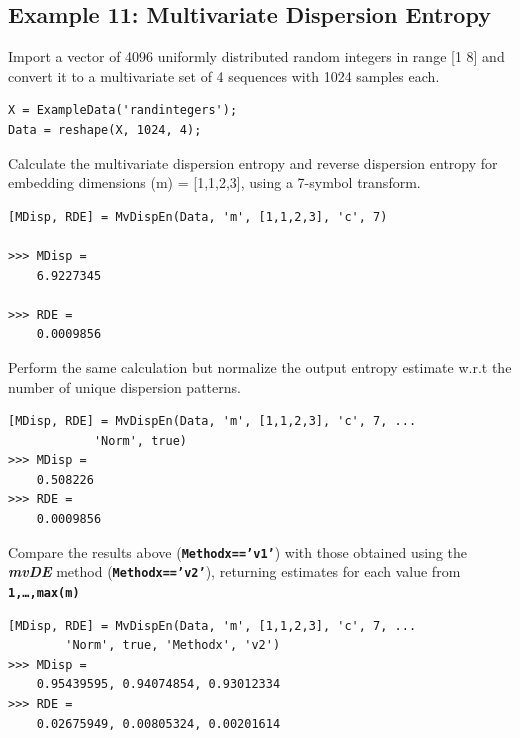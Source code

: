 \documentclass[12pt, a4paper, titlepage, openany]{book}
\begin{document}
\subsection{\normalsize Example 11: \hspace{15mm} Multivariate Dispersion Entropy}
\noindent Import a vector of 4096 uniformly distributed random integers in range [1 8] and convert it to a multivariate set of 4 sequences with 1024 samples each.
\begin{verbatim}
X = ExampleData('randintegers');
Data = reshape(X, 1024, 4);
\end{verbatim}
Calculate the multivariate dispersion entropy and reverse dispersion entropy for embedding dimensions (m) = [1,1,2,3], using a 7-symbol transform.
\begin{verbatim}
[MDisp, RDE] = MvDispEn(Data, 'm', [1,1,2,3], 'c', 7)

>>> MDisp =
    6.9227345

>>> RDE =
    0.0009856
\end{verbatim}
Perform the same calculation but normalize the output entropy estimate w.r.t the number of unique dispersion patterns.
\begin{verbatim}
[MDisp, RDE] = MvDispEn(Data, 'm', [1,1,2,3], 'c', 7, ... 
			'Norm', true)
>>> MDisp =
    0.508226
>>> RDE =
    0.0009856
\end{verbatim}    
Compare the results above (\texttt{\textbf{Methodx=='v1'}}) with those obtained using the \emph{\textbf{mvDE}} method (\texttt{\textbf{Methodx=='v2'}}), returning estimates for each value from \texttt{\textbf{1,…,max(m)}}
\begin{verbatim}
[MDisp, RDE] = MvDispEn(Data, 'm', [1,1,2,3], 'c', 7, ...
	    'Norm', true, 'Methodx', 'v2')
>>> MDisp =
    0.95439595, 0.94074854, 0.93012334
>>> RDE =
    0.02675949, 0.00805324, 0.00201614
\end{verbatim}



\newpage
\end{document}
